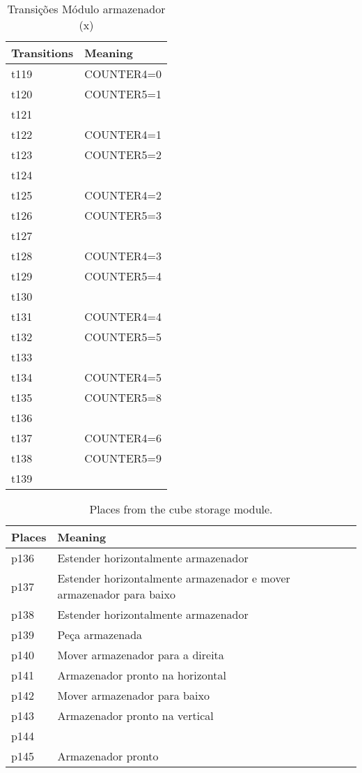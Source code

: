 \begin{table}[htbp]
\caption{Transições Módulo armazenador (x)}
\centering
\begin{tabular}{ll}
Transitions & Meaning\\
\hline
t119 & COUNTER4=0\\
t120 & COUNTER5=1\\
t121 & \\
t122 & COUNTER4=1\\
t123 & COUNTER5=2\\
t124 & \\
t125 & COUNTER4=2\\
t126 & COUNTER5=3\\
t127 & \\
t128 & COUNTER4=3\\
t129 & COUNTER5=4\\
t130 & \\
t131 & COUNTER4=4\\
t132 & COUNTER5=5\\
t133 & \\
t134 & COUNTER4=5\\
t135 & COUNTER5=8\\
t136 & \\
t137 & COUNTER4=6\\
t138 & COUNTER5=9\\
t139 & \\
\end{tabular}
\end{table}
\begin{table}[htbp]
\caption{Places from the cube storage module.}
\centering
\begin{tabular}{ll}
Places & Meaning\\
\hline
p136 & Estender horizontalmente armazenador\\
p137 & Estender horizontalmente armazenador e mover armazenador para baixo\\
p138 & Estender horizontalmente armazenador\\
p139 & Peça armazenada\\
p140 & Mover armazenador para a direita\\
p141 & Armazenador pronto na horizontal\\
p142 & Mover armazenador para baixo\\
p143 & Armazenador pronto na vertical\\
p144 & \\
p145 & Armazenador pronto\\
\end{tabular}
\end{table}


